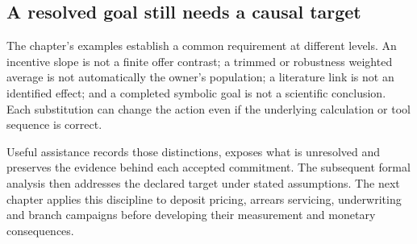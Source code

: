\subsection{A resolved goal still needs a causal target}

The chapter's examples establish a common requirement at different levels.
An incentive slope is not a finite offer contrast; a trimmed or robustness
weighted average is not automatically the owner's population; a literature
link is not an identified effect; and a completed symbolic goal is not a
scientific conclusion. Each substitution can change the action even if the
underlying calculation or tool sequence is correct.

Useful assistance records those distinctions, exposes what is unresolved and
preserves the evidence behind each accepted commitment. The subsequent formal
analysis then addresses the declared target under stated assumptions. The
next chapter applies this discipline to deposit pricing, arrears servicing,
underwriting and branch campaigns before developing their measurement and
monetary consequences.

